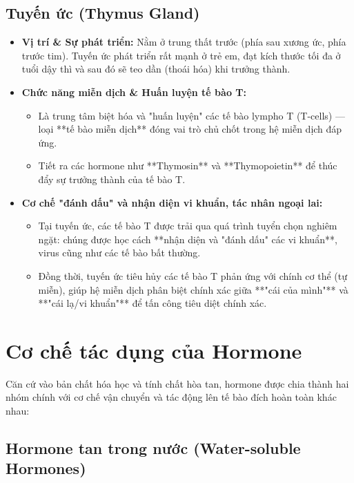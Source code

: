\subsection{Tuyến ức (Thymus Gland)}
\begin{itemize}
    \item \textbf{Vị trí \& Sự phát triển:} Nằm ở trung thất trước (phía sau xương ức, phía trước tim). Tuyến ức phát triển rất mạnh ở trẻ em, đạt kích thước tối đa ở tuổi dậy thì và sau đó sẽ teo dần (thoái hóa) khi trưởng thành.
    \item \textbf{Chức năng miễn dịch \& Huấn luyện tế bào T:}
    \begin{itemize}
        \item Là trung tâm biệt hóa và "huấn luyện" các tế bào lympho T (T-cells) — loại **tế bào miễn dịch** đóng vai trò chủ chốt trong hệ miễn dịch đáp ứng.
        \item Tiết ra các hormone như **Thymosin** và **Thymopoietin** để thúc đẩy sự trưởng thành của tế bào T.
    \end{itemize}
    \item \textbf{Cơ chế "đánh dấu" và nhận diện vi khuẩn, tác nhân ngoại lai:}
    \begin{itemize}
        \item Tại tuyến ức, các tế bào T được trải qua quá trình tuyển chọn nghiêm ngặt: chúng được học cách **nhận diện và "đánh dấu" các vi khuẩn**, virus cũng như các tế bào bất thường.
        \item Đồng thời, tuyến ức tiêu hủy các tế bào T phản ứng với chính cơ thể (tự miễn), giúp hệ miễn dịch phân biệt chính xác giữa **"cái của mình"** và **"cái lạ/vi khuẩn"** để tấn công tiêu diệt chính xác.
    \end{itemize}
\end{itemize}

\section{Cơ chế tác dụng của Hormone}

Căn cứ vào bản chất hóa học và tính chất hòa tan, hormone được chia thành hai nhóm chính với cơ chế vận chuyển và tác động lên tế bào đích hoàn toàn khác nhau:

\subsection{Hormone tan trong nước (Water-soluble Hormones)}


